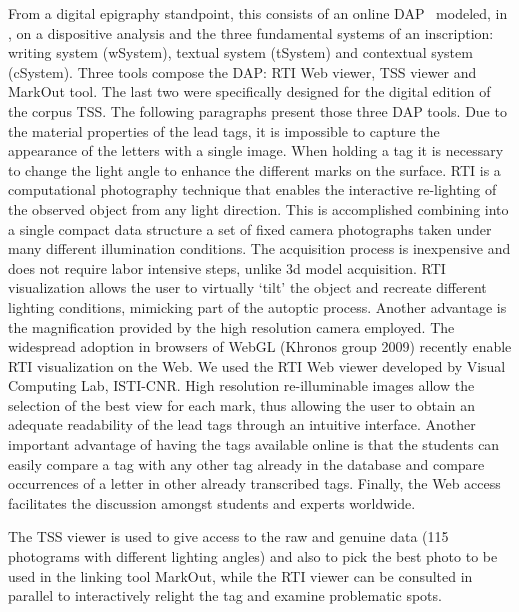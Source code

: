 \documentclass[amsthm,ebook]{saparticle}
\begin{document}
From a digital epigraphy standpoint, this consists of an online DAP \ modeled, in \citet{lame_primary_2014,Lame2015b}, on a dispositive analysis
and the three fundamental systems of an inscription: writing system (wSystem), textual system (tSystem) and contextual
system (cSystem). Three tools compose the DAP: RTI Web viewer, TSS viewer and MarkOut tool. The last two were
specifically designed for the digital edition of the corpus TSS. The following paragraphs present those three DAP
tools. Due to the material properties of the lead tags, it is impossible to capture the appearance of the letters with
a single image. When holding a tag it is necessary to change the light angle to enhance the different marks on the
surface. RTI is a computational photography technique that enables the interactive re-lighting of the observed object
from any light direction. This is accomplished combining into a single compact data structure a set of fixed camera
photographs taken under many different illumination conditions. The acquisition process is inexpensive and does not
require labor intensive steps, unlike 3d model acquisition. RTI visualization allows the user to virtually ‘tilt’ the
object and recreate different lighting conditions, mimicking part of the autoptic process. Another advantage is the
magnification provided by the high resolution camera employed. The widespread adoption in browsers of WebGL (Khronos
group 2009) recently enable RTI visualization on the Web. We used the RTI Web viewer developed by Visual Computing Lab,
ISTI-CNR. High resolution re-illuminable images allow the selection of the best view for each mark, thus allowing the
user to obtain an adequate readability of the lead tags through an intuitive interface. Another important advantage of
having the tags available online is that the students can easily compare a tag with any other tag already in the
database and compare occurrences of a letter in other already transcribed tags. Finally, the Web access facilitates the
discussion amongst students and experts worldwide.

The TSS viewer is used to give access to the raw and genuine data (115 photograms with different lighting angles) and
also to pick the best photo to be used in the linking tool MarkOut, while the RTI viewer can be consulted in parallel
to interactively relight the tag and examine problematic spots.
\end{document}
